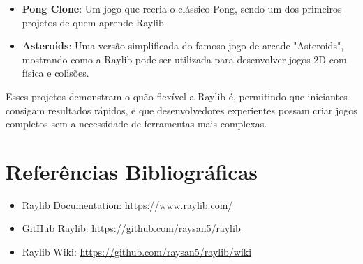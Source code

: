 \documentclass[a4paper,12pt]{article}
\begin{document}
\begin{itemize}
    \item \textbf{Pong Clone}: Um jogo que recria o clássico Pong, sendo um dos primeiros projetos de quem aprende Raylib.
    \item \textbf{Asteroids}: Uma versão simplificada do famoso jogo de arcade "Asteroids", mostrando como a Raylib pode ser utilizada para desenvolver jogos 2D com física e colisões.
\end{itemize}

Esses projetos demonstram o quão flexível a Raylib é, permitindo que iniciantes consigam resultados rápidos, e que desenvolvedores experientes possam criar jogos completos sem a necessidade de ferramentas mais complexas.

\section{Referências Bibliográficas}
\begin{itemize}
    \item Raylib Documentation: \url{https://www.raylib.com/}
    \item GitHub Raylib: \url{https://github.com/raysan5/raylib}
    \item Raylib Wiki: \url{https://github.com/raysan5/raylib/wiki}
\end{itemize}
\end{document}

